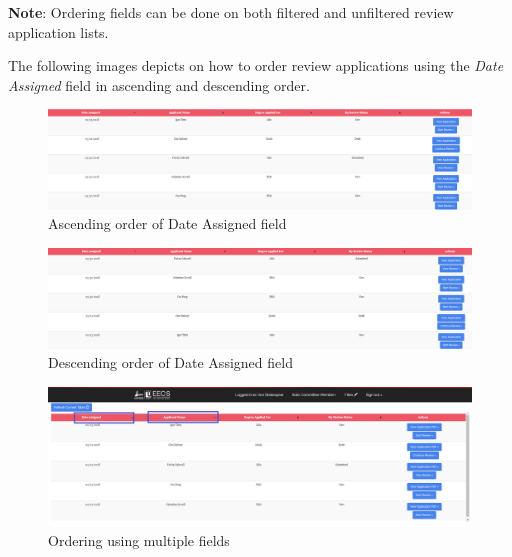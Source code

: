 \documentclass[fontsize=12pt,paper=letter,twoside]{scrartcl}
\begin{document}
\bigskip
\noindent \textbf{Note}: Ordering fields can be done on both filtered and unfiltered review application lists.

\bigskip
\noindent The following images depicts on how to order review applications using the \emph{Date Assigned} field in ascending and descending order.

\begin{figure}[!htb]
\begin{center}
\includegraphics[width=.99\textwidth]{images/cm/order_ascending.png}
\end{center}
\caption{Ascending order of Date Assigned field}
\label{fig:cm:order_ascending}
\end{figure}

\begin{figure}[!htb]
\begin{center}
\includegraphics[width=.99\textwidth]{images/cm/order_descending.png}
\end{center}
\caption{Descending order of Date Assigned field}
\label{fig:cm:order_descending}
\end{figure}

\newpage

\begin{figure}[!htb]
\begin{center}
\includegraphics[width=.99\textwidth]{images/cm/multiple_order.png}
\end{center}
\caption{Ordering using multiple fields}
\label{fig:cm:multiple_order}
\end{figure}
\end{document}
